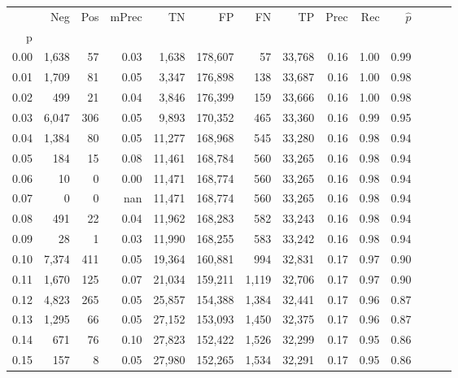 \begin{tabular}{rrrrrrrrrrrrrr}
\toprule
{} &     Neg &    Pos & mPrec &       TN &       FP &      FN &      TP &  Prec &   Rec & $\hat{p}$ \\
p    &         &        &       &          &          &         &         &       &       &           \\
\midrule
0.00 &   1,638 &     57 &  0.03 &    1,638 &  178,607 &      57 &  33,768 &  0.16 &  1.00 &      0.99 \\
0.01 &   1,709 &     81 &  0.05 &    3,347 &  176,898 &     138 &  33,687 &  0.16 &  1.00 &      0.98 \\
0.02 &     499 &     21 &  0.04 &    3,846 &  176,399 &     159 &  33,666 &  0.16 &  1.00 &      0.98 \\
0.03 &   6,047 &    306 &  0.05 &    9,893 &  170,352 &     465 &  33,360 &  0.16 &  0.99 &      0.95 \\
0.04 &   1,384 &     80 &  0.05 &   11,277 &  168,968 &     545 &  33,280 &  0.16 &  0.98 &      0.94 \\
0.05 &     184 &     15 &  0.08 &   11,461 &  168,784 &     560 &  33,265 &  0.16 &  0.98 &      0.94 \\
0.06 &      10 &      0 &  0.00 &   11,471 &  168,774 &     560 &  33,265 &  0.16 &  0.98 &      0.94 \\
0.07 &       0 &      0 &   nan &   11,471 &  168,774 &     560 &  33,265 &  0.16 &  0.98 &      0.94 \\
0.08 &     491 &     22 &  0.04 &   11,962 &  168,283 &     582 &  33,243 &  0.16 &  0.98 &      0.94 \\
0.09 &      28 &      1 &  0.03 &   11,990 &  168,255 &     583 &  33,242 &  0.16 &  0.98 &      0.94 \\
0.10 &   7,374 &    411 &  0.05 &   19,364 &  160,881 &     994 &  32,831 &  0.17 &  0.97 &      0.90 \\
0.11 &   1,670 &    125 &  0.07 &   21,034 &  159,211 &   1,119 &  32,706 &  0.17 &  0.97 &      0.90 \\
0.12 &   4,823 &    265 &  0.05 &   25,857 &  154,388 &   1,384 &  32,441 &  0.17 &  0.96 &      0.87 \\
0.13 &   1,295 &     66 &  0.05 &   27,152 &  153,093 &   1,450 &  32,375 &  0.17 &  0.96 &      0.87 \\
0.14 &     671 &     76 &  0.10 &   27,823 &  152,422 &   1,526 &  32,299 &  0.17 &  0.95 &      0.86 \\
0.15 &     157 &      8 &  0.05 &   27,980 &  152,265 &   1,534 &  32,291 &  0.17 &  0.95 &      0.86 \\

\end{tabular}
